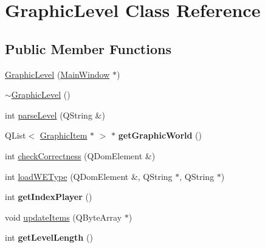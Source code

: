 \hypertarget{classGraphicLevel}{
\section{GraphicLevel Class Reference}
\label{classGraphicLevel}
}
\subsection*{Public Member Functions}
\begin{DoxyCompactItemize}
\item 
\hyperlink{classGraphicLevel_a4606d4095ca81e939494e806c0cf3d56}{GraphicLevel} (\hyperlink{classMainWindow}{MainWindow} $\ast$)
\item 
\hyperlink{classGraphicLevel_a6d8b5d675010d96d22c1393a926e9e9c}{$\sim$GraphicLevel} ()
\item 
int \hyperlink{classGraphicLevel_a27843328a2fdd52b52221b4d7c28c42e}{parseLevel} (QString \&)
\item 
\hypertarget{classGraphicLevel_a80409793a1937c3858f3e22fd5dd2ed4}{
QList$<$ \hyperlink{classGraphicItem}{GraphicItem} $\ast$ $>$ $\ast$ {\bfseries getGraphicWorld} ()}
\label{classGraphicLevel_a80409793a1937c3858f3e22fd5dd2ed4}

\item 
int \hyperlink{classGraphicLevel_abf207017c0a09c37c9011668b5407359}{checkCorrectness} (QDomElement \&)
\item 
int \hyperlink{classGraphicLevel_a143b52659bfeb1bf00747ecc6b693dd7}{loadWEType} (QDomElement \&, QString $\ast$, QString $\ast$)
\item 
\hypertarget{classGraphicLevel_a3772b549376fe21a8b8096bcf7384d05}{
int {\bfseries getIndexPlayer} ()}
\label{classGraphicLevel_a3772b549376fe21a8b8096bcf7384d05}

\item 
void \hyperlink{classGraphicLevel_a369384369a71c03e16b5a7fbcf11083d}{updateItems} (QByteArray $\ast$)
\item 
\hypertarget{classGraphicLevel_a63eaecd35130dea7c7e0a3054509ecde}{
int {\bfseries getLevelLength} ()}
\label{classGraphicLevel_a63eaecd35130dea7c7e0a3054509ecde}

\end{DoxyCompactItemize}
